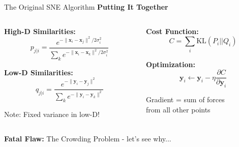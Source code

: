 \documentclass[10pt]{beamer}
\newcommand{\emphtext}[1]{\textcolor{upcblue}{\textbf{#1}}}
\newcommand{\warningbox}[1]{\colorbox{red!10}{\begin{minipage}{0.85\textwidth}\centering #1\end{minipage}}}
\begin{document}
\begin{frame}{The Original SNE Algorithm}
\emphtext{Putting It Together}

\vspace{0.3cm}
\begin{columns}[T]
\begin{column}{0.48\textwidth}
\textbf{High-D Similarities:}
$$p_{j|i} = \frac{e^{-\|\mathbf{x}_i-\mathbf{x}_j\|^2/2\sigma_i^2}}{\sum_k e^{-\|\mathbf{x}_i-\mathbf{x}_k\|^2/2\sigma_i^2}}$$

\textbf{Low-D Similarities:}
$$q_{j|i} = \frac{e^{-\|\mathbf{y}_i-\mathbf{y}_j\|^2}}{\sum_k e^{-\|\mathbf{y}_i-\mathbf{y}_k\|^2}}$$

\footnotesize Note: Fixed variance in low-D!
\end{column}

\begin{column}{0.48\textwidth}
\textbf{Cost Function:}
$$C = \sum_i \text{KL}(P_i||Q_i)$$

\textbf{Optimization:}
$$\mathbf{y}_i \leftarrow \mathbf{y}_i - \eta \frac{\partial C}{\partial \mathbf{y}_i}$$

\footnotesize
Gradient = sum of forces\\
from all other points
\end{column}
\end{columns}

\vspace{0.3cm}
\begin{center}
\warningbox{\footnotesize\textbf{Fatal Flaw:} The Crowding Problem - let's see why...}
\end{center}
\end{frame}
\end{document}
